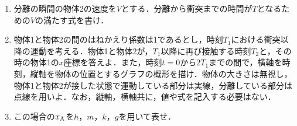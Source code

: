 \begin{enumerate}[I]
\begin{enumerate}[(1)]
    \item {\hzw}分離の瞬間の物体2の速度を$V$とする．分離から衝突までの時間が$T$となるための$V$の満たす式を書け．
    \item {\hzw}物体1と物体2の間のはねかえり係数は1であるとし，時刻$T_1$における衝突以降の運動を考える．物体1と物体2が，$T_1$以降に再び接触する時刻$T_2$と，その時の物体1の$x$座標を答えよ．また，時刻$t=0$から$2T_1$までの間で，横軸を時刻，縦軸を物体の位置とするグラフの概形を描け．物体の大きさは無視し，物体1と物体2が接した状態で運動している部分は実線，分離している部分は点線を用いよ．なお，縦軸，横軸共に，値や式を記入する必要はない．
    \item {\hzw}この場合の$x_\mathrm{A}$を$h$，$m$，$k$，$g$を用いて表せ．
  \end{enumerate}
\end{enumerate}

